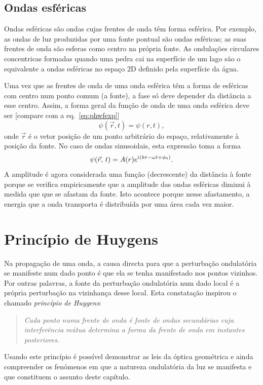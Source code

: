 \subsection{Ondas esféricas}
Ondas esféricas são ondas cujas frentes de onda têm forma esférica. Por exemplo,
as ondas de luz produzidas por uma fonte pontual são ondas esféricas; as suas
frentes de onda são esferas como centro na própria fonte. As ondulações
circulares concentricas formadas quando uma pedra cai na superfície de um lago
são o equivalente a ondas esféricas no espaço 2D definido pela superfície da
água.

Uma vez que as frentes de onda de uma onda esférica têm a forma de esféricas
com centro num ponto comum (a fonte), a fase só deve depender da distância a
esse centro. Assim, a forma geral da função de onda de uma onda
esférica deve ser [compare com a eq.~\eqref{eq:phwfexp}]
\begin{equation*}
\psi(\vec r,t)=\psi(r,t),
\end{equation*}
onde $\vec r$ é o vetor posição de um ponto arbitrário do espaço, relativamente
à posição da fonte. No caso de ondas sinusoidais, esta expressão toma a forma
\begin{equation}
\psi(\vec r,\,t)=A(r)e^{\iu(kr-\omega t+\phi_0)}.
\end{equation}
A amplitude é agora considerada uma função (decrescente) da distância à fonte
porque se verifica empiricamente que a amplitude das ondas esféricas diminui à
medida que que se afastam da fonte. Isto acontece porque nesse afastamento, a
energia que a onda transporta é distribuída por uma área cada vez maior.


\section{Princípio de Huygens}
Na propagação de uma onda, a causa directa para que a perturbação ondulatória se
manifeste num dado ponto é que ela se tenha manifestado nos pontos vizinhos. Por
outras palavras, a fonte da perturbação ondulatória num dado local é a própria
perturbação na vizinhança desse local. Esta constatação inspirou o chamado
\emph{princípio de Huygens}:
\begin{quote}
    \textsl{Cada ponto numa frente de onda é fonte de ondas secundárias cuja
    interferência mútua determina a forma da frente de onda em instantes
    posteriores.}
\end{quote}
Usando este princípio é possível demonstrar as leis da óptica geométrica e ainda
compreender os fenómenos em que a natureza ondulatória da luz se manifesta e que
constituem o assunto deste capítulo.


